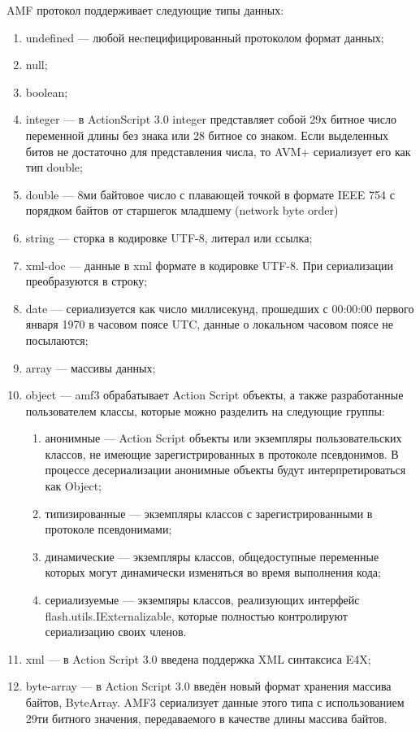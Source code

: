 AMF протокол поддерживает следующие типы данных:

\begin{enumerate}
\item undefined --- любой неcпецифицированный протоколом формат данных;
\item null;
\item boolean;
\item integer --- в ActionScript 3.0 integer представляет собой 29х битное число переменной длины без знака или 28 битное
со знаком. Если выделенных битов не достаточно для представления числа, то AVM+ сериализует его как тип double;
\item double --- 8ми байтовое число с плавающей точкой в формате IEEE 754 с порядком байтов от старшегок младшему
(network byte order)
\item string --- сторка в кодировке UTF-8, литерал или ссылка;
\item xml-doc --- данные в xml формате в кодировке UTF-8. При сериализации преобразуются в строку;
\item date --- сериализуется как число миллисекунд, прошедших с 00:00:00 первого января 1970 в часовом поясе UTC,
данные о локальном часовом поясе не посылаются;
\item array --- массивы данных;
\item object --- amf3 обрабатывает Action Script объекты, а также разработанные пользователем классы, которые можно
разделить на следующие группы:
\begin{enumerate}
\item анонимные --- Action Script объекты или экземпляры пользовательских классов, не имеющие зарегистрированных в
протоколе псевдонимов. В процессе десериализации анонимные объекты будут интерпретироваться как Object;
\item типизированные --- экземпляры классов с зарегистрированными в протоколе псевдонимами;
\item динамические --- экземпляры классов, общедоступные переменные которых могут динамически изменяться во время
выполнения кода;
\item сериализуемые --- экземпяры классов, реализующих интерфейс flash.utils.IExternalizable, которые полностью
контролируют сериализацию своих членов.
\end{enumerate}
\item xml --- в Action Script 3.0 введена поддержка XML синтаксиса E4X;
\item byte-array --- в Action Script 3.0 введён новый формат хранения массива байтов, ByteArray. AMF3 сериализует
данные этого типа с использованием 29ти битного значения, передаваемого в качестве длины массива байтов.
\end{enumerate} 

